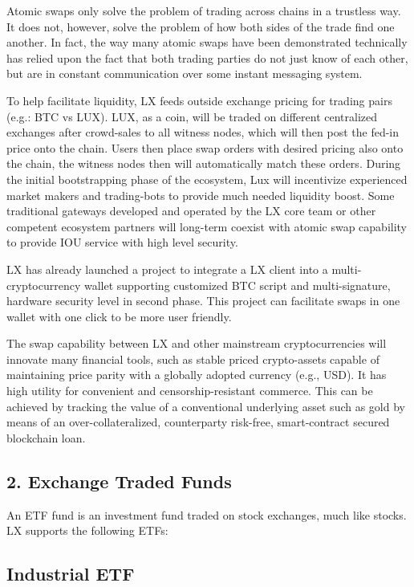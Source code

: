 \documentclass[11pt]{article}
\begin{document}
Atomic swaps only solve the problem of trading across chains in a trustless way. It does not, however, solve the problem of how both sides of the trade find one another. In fact, the way many atomic swaps have been demonstrated technically has relied upon the fact that both trading parties do not just know of each other, but are in constant communication over some instant messaging system.


To help facilitate liquidity, LX feeds outside exchange pricing for trading pairs (e.g.: BTC vs LUX). LUX, as a coin, will be traded on different centralized exchanges after crowd-sales to all witness nodes, which will then post the fed-in price onto the chain. Users then place swap orders with desired pricing also onto the chain, the witness nodes then will automatically match these orders. During the initial bootstrapping phase of the ecosystem, Lux will incentivize experienced market makers and trading-bots to provide much needed liquidity boost. Some traditional gateways developed and operated by the LX core team or other competent ecosystem partners will long-term coexist with atomic swap capability to provide IOU service with high level security.


LX has already launched a project to integrate a LX client into a multi-cryptocurrency wallet supporting customized BTC script and multi-signature, hardware security level in second phase. This project can facilitate swaps in one wallet with one click to be more user friendly.


The swap capability between LX and other mainstream cryptocurrencies will innovate many financial tools, such as stable priced crypto-assets capable of maintaining price parity with a globally adopted currency (e.g., USD). It has high utility for convenient and censorship-resistant commerce. This can be achieved by tracking the value of a conventional underlying asset such as gold by means of an over-collateralized, counterparty risk-free, smart-contract secured blockchain loan.


\subsection{2. Exchange Traded Funds}

An ETF fund is an investment fund traded on stock exchanges, much like stocks. LX supports the following ETFs:


\subsection{Industrial ETF}
\end{document}
